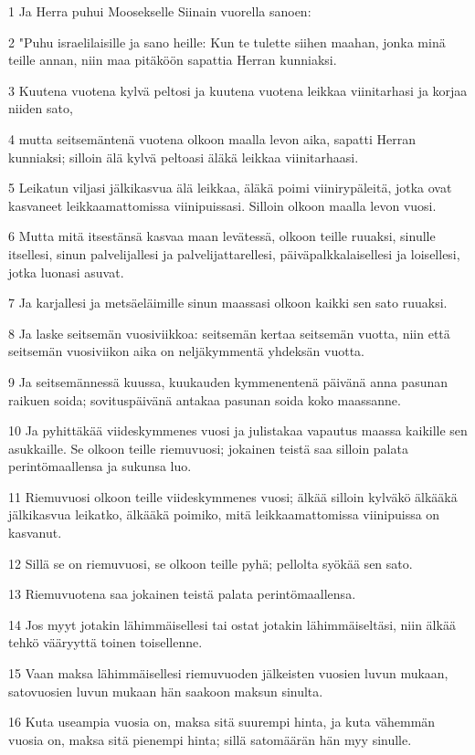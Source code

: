 \par 1 Ja Herra puhui Moosekselle Siinain vuorella sanoen:
\par 2 "Puhu israelilaisille ja sano heille: Kun te tulette siihen maahan, jonka minä teille annan, niin maa pitäköön sapattia Herran kunniaksi.
\par 3 Kuutena vuotena kylvä peltosi ja kuutena vuotena leikkaa viinitarhasi ja korjaa niiden sato,
\par 4 mutta seitsemäntenä vuotena olkoon maalla levon aika, sapatti Herran kunniaksi; silloin älä kylvä peltoasi äläkä leikkaa viinitarhaasi.
\par 5 Leikatun viljasi jälkikasvua älä leikkaa, äläkä poimi viinirypäleitä, jotka ovat kasvaneet leikkaamattomissa viinipuissasi. Silloin olkoon maalla levon vuosi.
\par 6 Mutta mitä itsestänsä kasvaa maan levätessä, olkoon teille ruuaksi, sinulle itsellesi, sinun palvelijallesi ja palvelijattarellesi, päiväpalkkalaisellesi ja loisellesi, jotka luonasi asuvat.
\par 7 Ja karjallesi ja metsäeläimille sinun maassasi olkoon kaikki sen sato ruuaksi.
\par 8 Ja laske seitsemän vuosiviikkoa: seitsemän kertaa seitsemän vuotta, niin että seitsemän vuosiviikon aika on neljäkymmentä yhdeksän vuotta.
\par 9 Ja seitsemännessä kuussa, kuukauden kymmenentenä päivänä anna pasunan raikuen soida; sovituspäivänä antakaa pasunan soida koko maassanne.
\par 10 Ja pyhittäkää viideskymmenes vuosi ja julistakaa vapautus maassa kaikille sen asukkaille. Se olkoon teille riemuvuosi; jokainen teistä saa silloin palata perintömaallensa ja sukunsa luo.
\par 11 Riemuvuosi olkoon teille viideskymmenes vuosi; älkää silloin kylväkö älkääkä jälkikasvua leikatko, älkääkä poimiko, mitä leikkaamattomissa viinipuissa on kasvanut.
\par 12 Sillä se on riemuvuosi, se olkoon teille pyhä; pellolta syökää sen sato.
\par 13 Riemuvuotena saa jokainen teistä palata perintömaallensa.
\par 14 Jos myyt jotakin lähimmäisellesi tai ostat jotakin lähimmäiseltäsi, niin älkää tehkö vääryyttä toinen toisellenne.
\par 15 Vaan maksa lähimmäisellesi riemuvuoden jälkeisten vuosien luvun mukaan, satovuosien luvun mukaan hän saakoon maksun sinulta.
\par 16 Kuta useampia vuosia on, maksa sitä suurempi hinta, ja kuta vähemmän vuosia on, maksa sitä pienempi hinta; sillä satomäärän hän myy sinulle.
